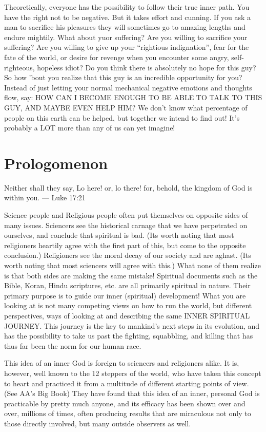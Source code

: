 \documentclass[12pt,letterpaper]{book}
\begin{document}
Theoretically, everyone has the possibility to follow their true inner path. You have the right not to be negative. But it takes effort and cunning. If you ask a man to sacrifice his pleasures they will sometimes go to amazing lengths and endure mightily. What about yuor suffering? Are you willing to sacrifice your suffering? Are you willing to give up your ``rightious indignation'', fear for the fate of the world, or desire for revenge when you encounter some angry, self-righteous, hopeless idiot? Do you think there is absolutely no hope for this guy? So how 'bout you realize that this guy is an incredible opportunity for you? Instead of just letting your normal mechanical negative emotions and thoughts flow, say: HOW CAN I BECOME ENOUGH TO BE ABLE TO TALK TO THIS GUY, AND MAYBE EVEN HELP HIM? We don't know what percentage of people on this earth can be helped, but together we intend to find out! It's probably a LOT more than any of us can yet imagine!

\chapter{Prologomenon}

Neither shall they say, Lo here! or, lo there! for, behold, the kingdom of God is within you. --- Luke 17:21

Science people and Religious people often put themselves on opposite sides of many issues. Sciencers see the historical carnage that we have perpetrated on ourselves, and conclude that spiritual is bad. (Its worth noting that most religioners heartily agree with the first part of this, but come to the opposite conclusion.) Religioners see the moral decay of our society and are aghast. (Its worth noting that most sciencers will agree with this.) What none of them realize is that both sides are making the same mistake! Spiritual documents such as the Bible, Koran, Hindu scriptures, etc. are all primarily spiritual in nature. Their primary purpose is to guide our inner (spiritual) development! What you are looking at is not many competing views on how to run the world, but different perspectives, ways of looking at and describing the same INNER SPIRITUAL JOURNEY. This journey is the key to mankind's next steps in its evolution, and has the possibility to take us past the fighting, squabbling, and killing that has thus far been the norm for our human race.

This idea of an inner God is foreign to sciencers and religioners alike. It is, however, well known to the 12 steppers of the world, who have taken this concept to heart and practiced it from a multitude of different starting points of view. (See AA's Big Book) They have found that this idea of an inner, personal God is practicable by pretty much anyone, and its efficacy has been shown over and over, millions of times, often producing results that are miraculous not only to those directly involved, but many outside observers as well.  
\end{document}
